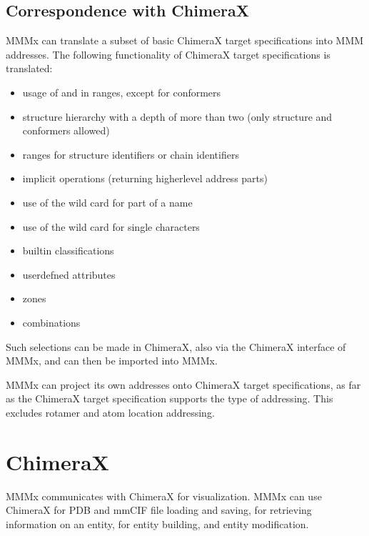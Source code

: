 \documentclass[letterpaper,10pt,english]{sphinxmanual}
\begin{document}
\section{Correspondence with ChimeraX}
\label{\detokenize{object_access:correspondence-with-chimerax}}
MMMx can translate a subset of basic ChimeraX target specifications into MMM addresses. The following functionality of ChimeraX target specifications is  translated:
\begin{itemize}
\item {} 
usage of  and  in ranges, except for conformers

\item {} 
structure hierarchy with a depth of more than two (only structure and conformers allowed)

\item {} 
ranges for structure identifiers or chain identifiers

\item {} 
implicit operations (returning higher\sphinxhyphen{}level address parts)

\item {} 
use of the wild card \sphinxcode{\sphinxupquote{*}} for part of a name

\item {} 
use of the wild card  for single characters

\item {} 
built\sphinxhyphen{}in classifications

\item {} 
user\sphinxhyphen{}defned attributes

\item {} 
zones

\item {} 
combinations

\end{itemize}

Such selections can be made in ChimeraX, also via the ChimeraX interface of MMMx, and can then be imported into MMMx.

MMMx can project its own addresses onto ChimeraX target specifications, as far as the ChimeraX target specification supports the type of addressing.
This excludes rotamer and atom location addressing.


\chapter{ChimeraX}
\label{\detokenize{ChimeraX:chimerax}}\label{\detokenize{ChimeraX::doc}}
MMMx communicates with ChimeraX for visualization. MMMx can use ChimeraX for PDB and mmCIF file loading and saving, for retrieving information on an entity, for entity building, and entity modification.
\end{document}
